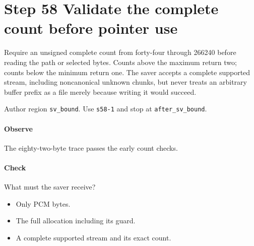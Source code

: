 \section{Step 58 Validate the complete count before pointer use}\label{pcm-wav-s58}
Require an unsigned complete count from forty-four through 266240 before reading the path or selected bytes. Counts above the maximum return two; counts below the minimum return one. The saver accepts a complete supported stream, including noncanonical unknown chunks, but never treats an arbitrary buffer prefix as a file merely because writing it would succeed.

Author region \texttt{sv\_bound}. Use \texttt{s58-1} and stop at \texttt{after\_sv\_bound}.

\paragraph{Observe} The eighty-two-byte trace passes the early count checks.

\paragraph{Check} What must the saver receive?
\begin{itemize}
  \item[A.] Only PCM bytes.
  \item[B.] The full allocation including its guard.
  \item[C.] A complete supported stream and its exact count.
\end{itemize}

